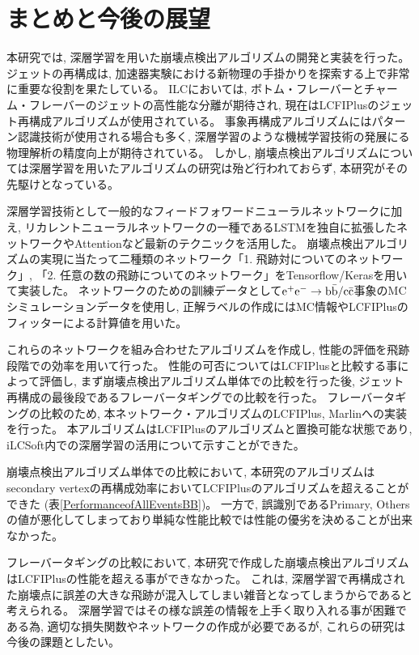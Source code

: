 
\chapter{まとめと今後の展望} \label{chap:Conclusion}

本研究では, 深層学習を用いた崩壊点検出アルゴリズムの開発と実装を行った。
ジェットの再構成は, 加速器実験における新物理の手掛かりを探索する上で非常に重要な役割を果たしている。
ILCにおいては, ボトム・フレーバーとチャーム・フレーバーのジェットの高性能な分離が期待され, 現在はLCFIPlusのジェット再構成アルゴリズムが使用されている。
事象再構成アルゴリズムにはパターン認識技術が使用される場合も多く, 深層学習のような機械学習技術の発展にる物理解析の精度向上が期待されている。
しかし, 崩壊点検出アルゴリズムについては深層学習を用いたアルゴリズムの研究は殆ど行われておらず, 本研究がその先駆けとなっている。

深層学習技術として一般的なフィードフォワードニューラルネットワークに加え, リカレントニューラルネットワークの一種であるLSTMを独自に拡張したネットワークやAttentionなど最新のテクニックを活用した。
崩壊点検出アルゴリズムの実現に当たって二種類のネットワーク「1. 飛跡対についてのネットワーク」, 「2. 任意の数の飛跡についてのネットワーク」をTensorflow/Kerasを用いて実装した。
ネットワークのための訓練データとして$\rm e^+e^- \to b \bar{b}/c \bar{c}$事象のMCシミュレーションデータを使用し, 正解ラベルの作成にはMC情報やLCFIPlusのフィッターによる計算値を用いた。

これらのネットワークを組み合わせたアルゴリズムを作成し, 性能の評価を飛跡段階での効率を用いて行った。
性能の可否についてはLCFIPlusと比較する事によって評価し, まず崩壊点検出アルゴリズム単体での比較を行った後, ジェット再構成の最後段であるフレーバータギングでの比較を行った。
フレーバータギングの比較のため, 本ネットワーク・アルゴリズムのLCFIPlus, Marlinへの実装を行った。
本アルゴリズムはLCFIPlusのアルゴリズムと置換可能な状態であり, iLCSoft内での深層学習の活用について示すことができた。

崩壊点検出アルゴリズム単体での比較において, 本研究のアルゴリズムはsecondary vertexの再構成効率においてLCFIPlusのアルゴリズムを超えることができた (表\ref{PerformanceofAllEventsBB})。
一方で, 誤識別であるPrimary, Othersの値が悪化してしまっており単純な性能比較では性能の優劣を決めることが出来なかった。

フレーバータギングの比較において, 本研究で作成した崩壊点検出アルゴリズムはLCFIPlusの性能を超える事ができなかった。
これは, 深層学習で再構成された崩壊点に誤差の大きな飛跡が混入してしまい雑音となってしまうからであると考えられる。
深層学習ではその様な誤差の情報を上手く取り入れる事が困難である為, 適切な損失関数やネットワークの作成が必要であるが, これらの研究は今後の課題としたい。\\

